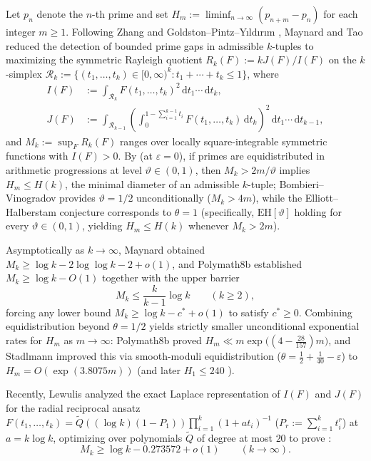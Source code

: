 \documentclass[11pt, reqno]{amsart}
\theoremstyle{remark}
\numberwithin{equation}{section}
\newcommand{\cR}{\mathcal{R}}
\newcommand{\dd}{\,\mathrm{d}}
\begin{document}
Let $p_n$ denote the $n$-th prime and set $H_m := \liminf_{n\to\infty} (p_{n+m} - p_n)$
for each integer $m \ge 1$. Following Zhang \cite{Zhang} and Goldston--Pintz--Y{\i}ld{\i}r{\i}m
\cite{GPY}, Maynard \cite{Maynard} and Tao reduced the detection of bounded prime gaps in
admissible $k$-tuples to maximizing the symmetric Rayleigh quotient
$R_k(F) := k J(F)/I(F)$ on the $k$-simplex
$\cR_k := \{(t_1,\dots,t_k) \in [0,\infty)^k : t_1 + \cdots + t_k \le 1\}$, where
\begin{align*}
I(F) &:= \int_{\cR_k} F(t_1,\dots,t_k)^2 \dd t_1\cdots \dd t_k, \\
J(F) &:= \int_{\cR_{k-1}} \left(\int_0^{1-\sum_{i=1}^{k-1} t_i}
F(t_1,\dots,t_k)\dd t_k \right)^{\!2} \dd t_1\cdots \dd t_{k-1},
\end{align*}
and $M_k := \sup_{F} R_k(F)$ ranges over locally square-integrable symmetric functions
with $I(F) > 0$. By \cite[Theorems~22 and~26]{PM8b} (at $\varepsilon = 0$), if primes are equidistributed in
arithmetic progressions at level $\vartheta \in (0, 1)$, then $M_k > 2m/\vartheta$ implies
$H_m \le H(k)$, the minimal diameter of an admissible $k$-tuple; Bombieri--Vinogradov
provides $\vartheta = 1/2$ unconditionally ($M_k > 4m$), while the Elliott--Halberstam conjecture
corresponds to $\theta = 1$ (specifically, $\mathrm{EH}[\vartheta]$ holding for every $\vartheta \in (0, 1)$,
yielding $H_m \le H(k)$ whenever $M_k > 2m$).

Asymptotically as $k \to \infty$, Maynard \cite{Maynard} obtained
$M_k \ge \log k - 2\log\log k - 2 + o(1)$, and Polymath8b \cite[Corollary~37]{PM8b}
established $M_k \ge \log k - O(1)$ together with the upper barrier
\begin{equation}\label{eq:pm8b-barrier}
M_k \le \frac{k}{k-1}\log k \qquad (k \ge 2),
\end{equation}
forcing any lower bound $M_k \ge \log k - c^* + o(1)$ to satisfy $c^* \ge 0$. Combining
equidistribution beyond $\theta = 1/2$ yields strictly smaller unconditional exponential
rates for $H_m$ as $m \to \infty$: Polymath8b \cite{PM8b} proved $H_m \ll m\exp\bigl((4-\tfrac{28}{157})m\bigr)$, and Stadlmann \cite{Stadlmann2025}
improved this via smooth-moduli equidistribution ($\theta = \tfrac{1}{2}+\tfrac{1}{40}-\varepsilon$)
to $H_m = O(\exp(3.8075 m))$ (and later $H_1 \le 240$ \cite{Stadlmann2026}).

Recently, Lewulis \cite{Lewulis} analyzed the exact Laplace representation of $I(F)$ and
$J(F)$ for the radial reciprocal ansatz
$F(t_1,\dots,t_k) = \widetilde{Q}((\log k)(1-P_1)) \prod_{i=1}^k (1 + a t_i)^{-1}$
($P_r := \sum_{i=1}^k t_i^r$) at $a = k\log k$, optimizing over polynomials $\widetilde{Q}$
of degree at most $20$ to prove \cite[Theorem~3]{Lewulis}:
\begin{equation}\label{eq:lewulis-bound}
M_k \ge \log k - 0.273572 + o(1) \qquad (k \to \infty).
\end{equation}
\end{document}
